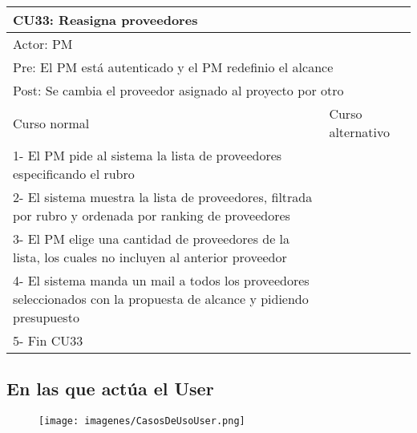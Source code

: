 \begin{table}[H]
  \begin{adjustbox}{max width = \textwidth}
  \begin{tabular}{|l|l|}
    \hline
    \multicolumn{2}{|l|}{CU33: Reasigna proveedores
} \\\hline
    \multicolumn{2}{|l|}{Actor: PM} \\\hline
    \multicolumn{2}{|l|}{Pre: El PM está autenticado y el PM redefinio el alcance} \\\hline
    \multicolumn{2}{|l|}{Post: Se cambia el proveedor asignado al proyecto por otro} \\\hline
     Curso normal & Curso alternativo\\ \hline
     1- El PM pide al sistema la lista de proveedores especificando el rubro & \\ \hline
     2- El sistema muestra la lista de proveedores, filtrada por rubro y ordenada por ranking de proveedores & \\ \hline
     3- El PM elige una cantidad de proveedores de la lista, los cuales no incluyen al anterior proveedor& \\ \hline
     4- El sistema manda un mail a todos los proveedores seleccionados con la propuesta de alcance y pidiendo presupuesto & \\ \hline
     5- Fin CU33 & \\ \hline
  \end{tabular}
  \end{adjustbox}
\end{table}

\subsection{En las que actúa el User}

\begin{figure}[H]
    \texttt{[image: imagenes/CasosDeUsoUser.png]}
\end{figure}

